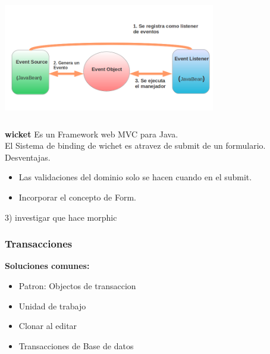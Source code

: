 \includegraphics[width=350px, height=200px]{img/javabeans}


{\bf wicket} Es un Framework web MVC para Java.\\
El Sistema de binding de wichet es atravez de submit de un formulario.
Desventajas.
\begin {itemize}

\item Las validaciones del dominio solo se hacen cuando en el submit.

\item Incorporar el concepto de Form.

\end {itemize}

3) investigar que hace morphic




\subsubsection{Transacciones}

{\bf Soluciones comunes:}

\begin {itemize}

\item Patron: Objectos de transaccion
\item Unidad de trabajo
\item Clonar al editar
\item Transacciones de Base de datos 
\end {itemize}


